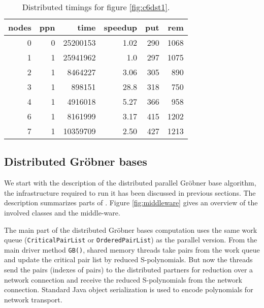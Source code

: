 \documentclass[10pt,twocolumn,a4paper]{article}
\newcommand{\code}[1]{\texttt{#1}}
\begin{document}
\begin{table}[thb]
\centering
\caption{Distributed timings for figure \ref{fig:c6dst1}.}
\label{fig:c6dst1t}
\small{
\clearpage{}
\begin{tabular}{|r|r|r|r|r|r|}
\hline
 nodes & ppn & time & speedup & put & rem 
\\ \hline
 0 & 0 & 25200153 & 1.02 & 290 & 1068
\\ \hline
 1 & 1 & 25941962 & 1.0 & 297 & 1075
\\ \hline
 2 & 1 & 8464227 & 3.06 & 305 & 890
\\ \hline
 3 & 1 & 898151 & 28.8 & 318 & 750
\\ \hline
 4 & 1 & 4916018 & 5.27 & 366 & 958
\\ \hline
 6 & 1 & 8161999 & 3.17 & 415 & 1202
\\ \hline
 7 & 1 & 10359709 & 2.50 & 427 & 1213
\\ \hline
\end{tabular}
\clearpage{}
}
\end{table}


\subsection{Distributed Gr\"ob\-ner bases} 

We start with the description of the distributed parallel Gr\"obner
base algorithm, the infrastructure required to run it has been
discussed in previous sections.  The description summarizes parts of
\cite{Kredel:2009,Kredel:2010}.  Figure \ref{fig:middleware} gives an
overview of the involved classes and the middle-ware.

The main part of the distributed Gr\"obner bases computation uses the
same work queue (\code{Critical\-Pair\-List} or
\code{Ordered\-Pair\-List}) as the parallel version. From the main
driver method \code{GB()}, shared memory threads take pairs from the
work queue and update the critical pair list by reduced S-polynomials.
But now the threads send the pairs (indexes of pairs) to the
distributed partners for reduction over a network connection and
receive the reduced S-polynomials from the network connection.
Standard Java object serialization is used to encode polynomials for
network transport.
\end{document}
